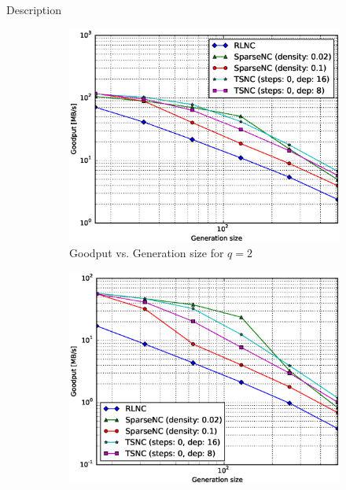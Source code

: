 Description

\begin{figure}
    \centering
    \begin{subfigure}[b]{0.475\textwidth}
        \centering
        \includegraphics[width=1.15\textwidth]{images/23_07_2015/goodput_vs_generation_size_Rasp_v2_decoder_Binary_1600.eps}
        \caption[]%
        {{\small Goodput vs. Generation size for $q = 2$}}
        \label{fig:dec_good_rasp2_gen_gf2}
    \end{subfigure}
    \hfill
    \begin{subfigure}[b]{0.475\textwidth}
        \centering
        \includegraphics[width=1.15\textwidth]{images/23_07_2015/goodput_vs_generation_size_Rasp_v2_decoder_Binary8_1600.eps}

\end{subfigure}
\end{figure}
